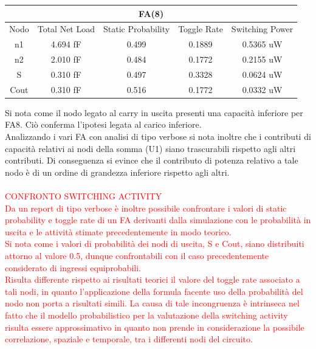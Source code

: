 \documentclass[11pt,  english, makeidx, a4paper, titlepage, oneside]{book}
\begin{document}
\vspace{0.3cm}
\begin{center}
	\begin{tabular}{|c|c|c|c|c|}
	\multicolumn{5}{c}{FA(8) }\\
	\hline
	Nodo &  Total Net Load & Static Probability & Toggle Rate & Switching Power \\ 
	\hline
	n1 & 4.694 fF & 0.499 & 0.1889 & 0.5365 uW  \\
	\hline
	n2 & 2.010 fF & 0.484 & 0.1772 & 0.2155 uW  \\
	\hline
	S & 0.310 fF & 0.497 & 0.3328 & 0.0624 uW  \\
	\hline
	Cout & 0.310 fF & 0.516 &  0.1772 & 0.0332 uW  \\
	\hline
	\end{tabular}
\end{center}
\vspace{0.3cm}
Si nota come il nodo legato al carry in uscita presenti una capacità inferiore per FA8. Ciò conferma l'ipotesi legata al carico inferiore.
\\
Analizzando i vari FA con analisi di tipo verbose si nota inoltre che i contributi di capacità relativi ai nodi della somma (U1) siano trascurabili rispetto agli altri contributi.
Di conseguenza si evince che il contributo di potenza relativo a tale nodo è di un ordine di grandezza inferiore rispetto agli altri.
\\\\
\textcolor{red}{CONFRONTO SWITCHING ACTIVITY 
\\
Da un report di tipo verbose è inoltre possibile confrontare i valori di static probability e toggle rate di un FA derivanti dalla
simulazione con le probabilità in uscita e le attività stimate precedentemente in modo teorico. 
\\
Si nota come i valori di probabilità dei
nodi di uscita, S e Cout, siano distribuiti attorno al valore 0.5, dunque confrontabili con il caso precedentemente considerato di ingressi equiprobabili. 
\\
Risulta differente rispetto ai risultati teorici il valore del toggle rate associato a tali nodi, in quanto l'applicazione
della formula facente uso della probabilità del nodo non porta a risultati simili. La causa di tale incongruenza è intrinseca nel fatto
che il modello probabilistico per la valutazione della switching activity risulta essere approssimativo in quanto non prende in 
considerazione la possibile correlazione, spaziale e temporale, tra i differenti nodi del circuito.}
\end{document}
